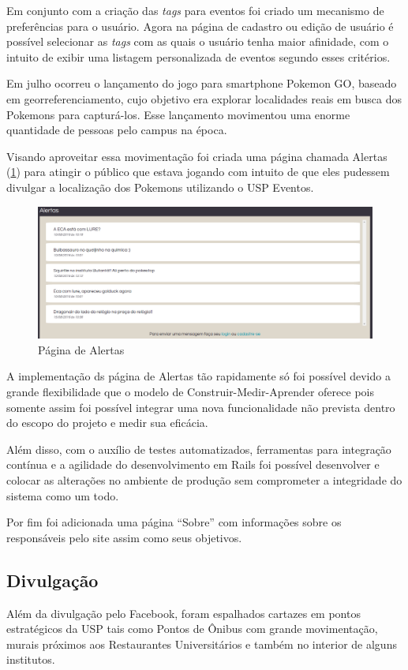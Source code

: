 \par Em conjunto com a criação das \emph{tags} para eventos foi criado um mecanismo de preferências para o usuário. Agora na página de cadastro ou edição de usuário é possível selecionar as \emph{tags} com as quais o usuário tenha maior afinidade, com o intuito de exibir uma listagem personalizada de eventos segundo esses critérios.
\par Em julho ocorreu o lançamento do jogo para smartphone Pokemon GO, baseado em georreferenciamento, cujo objetivo era explorar localidades reais em busca dos
Pokemons para capturá-los. Esse lançamento movimentou uma enorme quantidade de pessoas pelo campus na época.
\par Visando aproveitar essa movimentação foi criada uma página chamada Alertas (\ref{fig:alert_page}) para atingir o público que estava jogando com intuito de que eles pudessem divulgar a localização dos Pokemons utilizando o USP Eventos.
\begin{figure}[htb]
\centering
\includegraphics[width=15cm]{figuras/alert_page}
\centering
\caption{\label{fig:alert_page} Página de Alertas}
\end{figure}
\par A implementação ds página de Alertas tão rapidamente só foi possível devido a grande flexibilidade que o modelo de Construir-Medir-Aprender oferece pois somente assim foi possível integrar uma nova funcionalidade não prevista dentro do escopo do projeto e medir sua eficácia.
\par Além disso, com o auxílio de testes automatizados, ferramentas para integração contínua e a agilidade do desenvolvimento em Rails foi possível desenvolver e colocar as alterações no ambiente de produção sem comprometer a integridade do sistema como um todo.
\par Por fim foi adicionada uma página ``Sobre'' com informações sobre os responsáveis pelo site assim como seus objetivos.
\subsection{Divulgação}
\par Além da divulgação pelo Facebook, foram espalhados cartazes em pontos estratégicos da USP tais como Pontos de Ônibus com grande movimentação, murais próximos aos Restaurantes Universitários e também no interior de alguns institutos.


